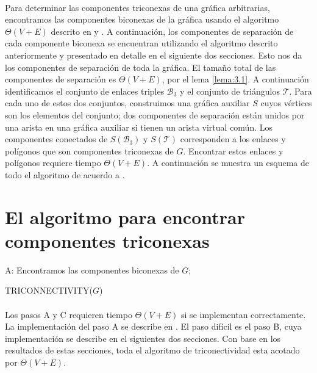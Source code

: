 \paragraph{}
Para determinar las componentes triconexas de una gráfica arbitrarias, encontramos las componentes biconexas de la gráfica usando el algoritmo $\Theta \left(V + E\right)$ descrito en \citep{4569669} y \citep{efalgm}. A continuación, los componentes de separación de cada componente biconexa se encuentran utilizando el algoritmo descrito anteriormente y presentado en detalle en el siguiente dos secciones. Esto nos da los componentes de separación de toda la gráfica. El tamaño total de las componentes de separación es $\Theta \left(V + E\right)$, por el lema \ref{lema:3.1}. A continuación identificamos el conjunto de enlaces triples $\mathscr{B}_{3}$ y el conjunto de triángulos $\mathscr{T}$. Para cada uno de estos dos conjuntos, construimos una gráfica auxiliar $S$ cuyos vértices son los elementos del conjunto; dos componentes de separación están unidos por una arista en una gráfica auxiliar si tienen un arista virtual común. Los componentes conectados de $S\left(\mathscr{B}_{3}\right)$ y $S\left(\mathscr{T}\right)$ corresponden a los enlaces y polígonos que son componentes triconexas de $G$. Encontrar estos enlaces y polígonos requiere tiempo $\Theta \left(V + E\right)$. A continuación se muestra un esquema de todo el algoritmo de acuerdo a \citep{Gutwenger2000ALT}.

\section{El algoritmo para encontrar componentes triconexas}

\begin{algorithm}[!ht]
\DontPrintSemicolon
 A: Encontramos las componentes biconexas de $G$;\;
\caption{TRICONNECTIVITY($G$)}\label{alg:triconexidad}
\end{algorithm}

\paragraph{}
Los pasos A y C requieren tiempo $\Theta \left(V + E\right)$ si se implementan correctamente. La implementación del paso A se describe en \citep{4569669}. El paso difícil es el paso B, cuya implementación se describe en el siguientes dos secciones. Con base en los resultados de estas secciones, toda el algoritmo de triconectividad esta acotado por $\Theta  \left(V + E\right)$.

